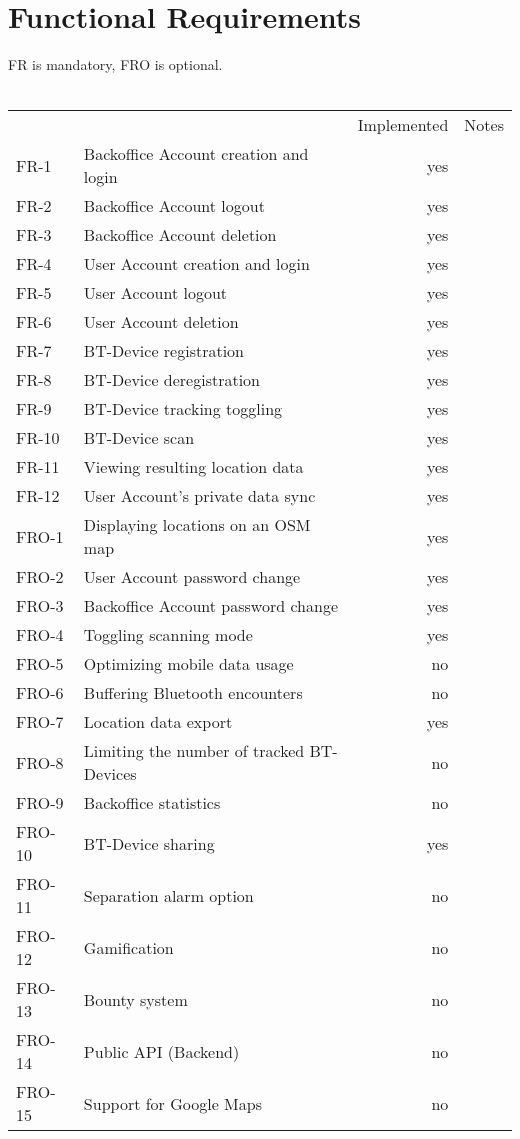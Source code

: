 \chapter{Functional Requirements}
FR is mandatory, FRO is optional. \\
\\
\begin{tabular}{ l l r l }
 & & Implemented & Notes \\
FR-1 & Backoffice Account creation and login & yes & \\
FR-2 & Backoffice Account logout & yes & \\
FR-3 & Backoffice Account deletion & yes & \\
FR-4 & User Account creation and login & yes & \\
FR-5 & User Account logout & yes & \\
FR-6 & User Account deletion & yes & \\
FR-7 & BT-Device registration & yes & \\
FR-8 & BT-Device deregistration & yes & \\
FR-9 & BT-Device tracking toggling & yes & \\
FR-10 & BT-Device scan & yes & \\
FR-11 & Viewing resulting location data & yes & \\
FR-12 & User Account’s private data sync & yes & \\
FRO-1 & Displaying locations on an OSM map & yes & \\
FRO-2 & User Account password change & yes & \\
FRO-3 & Backoffice Account password change & yes & \\
FRO-4 & Toggling scanning mode & yes & \\
FRO-5 & Optimizing mobile data usage & no & \\
FRO-6 & Buffering Bluetooth encounters & no & \\
FRO-7 & Location data export & yes & \\
FRO-8 & Limiting the number of tracked BT-Devices & no & \\
FRO-9 & Backoffice statistics & no & \\
FRO-10 & BT-Device sharing & yes & \\
FRO-11 & Separation alarm option & no & \\
FRO-12 & Gamification & no & \\
FRO-13 & Bounty system & no & \\
FRO-14 & Public API (Backend) & no & \\
FRO-15 & Support for Google Maps & no & \\
\end{tabular}
